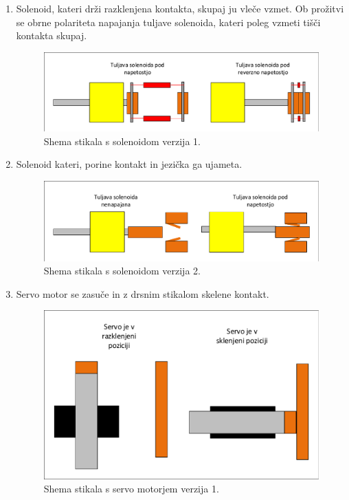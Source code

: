 \documentclass[a4paper,twoside,openright,12pt,slovene]{book}
\begin{document}
    \begin{enumerate}
   
        \item  Solenoid, kateri drži razklenjena kontakta, skupaj ju vleče vzmet. Ob prožitvi se obrne polariteta napajanja tuljave solenoida, kateri poleg vzmeti tišči kontakta skupaj.
    \begin{figure}[H]
        \centering
        \includegraphics[width=1\columnwidth]{Sheme/StikaloSolenoidVerzija1.pdf}
        \caption{\label{/StikaloSolenoidVerzija1} Shema stikala s solenoidom verzija 1.}
    \end{figure}
    
    \item  Solenoid kateri, porine kontakt in jezička ga ujameta.
    \begin{figure}[H]
        \centering
        \includegraphics[width=1\columnwidth]{Sheme/StikaloSolenoidVerzija2.pdf}
        \caption{\label{/StikaloSolenoidVerzija2} Shema stikala s solenoidom verzija 2.}
    \end{figure}
    
    \item  Servo motor se zasuče in z drsnim stikalom skelene kontakt.
    \begin{figure}[H]
        \centering
        \includegraphics[width=1\columnwidth]{Sheme/StikaloServoVerzija1.pdf}
        \caption{\label{StikaloServoVerzija1} Shema stikala s servo motorjem verzija 1.}
    \end{figure}
    

\end{enumerate}
\end{document}
